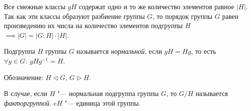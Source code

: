 \begin{Proof}
  Все смежные классы $gH$ содержат одно и то же количество элементов равное $\mathopen|H\mathclose|$. Так как эти классы образуют разбиение группы $G$, то порядок группы $G$ равен произведению их числа на количество элементов подгруппы $H$ $\implies \mathopen|G\mathclose| = \mathopen|G:H\mathclose| \cdot \mathopen|H\mathclose|$.
\end{Proof}

\begin{definition}
  Подгруппа $H$ группы $G$ называется \textit{нормальной}, если $gH=Hg$, то есть $\forall g \in G:~ gHg^{-1} = H$.

  Обозначение: $H \lhd G$, $G \rhd H$.
\end{definition}
В случае, если $H$ "--- нормальная  подгруппа группы $G$, то $G / H$ называется \textit{факторгруппой}.
$eH$ "--- единица этой группы.

